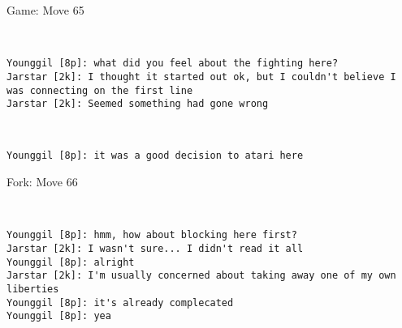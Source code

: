\documentclass{article}
\begin{document}
\begin{section}{Game: Move 65}
\begin{center}
\cleargoban
{}
\showfullgoban
\\\begin{lstlisting}
Younggil [8p]: what did you feel about the fighting here?
Jarstar [2k]: I thought it started out ok, but I couldn't believe I was connecting on the first line
Jarstar [2k]: Seemed something had gone wrong
\end{lstlisting}
\end{center}
\begin{center}
\cleargoban
{}
\showfullgoban
\\\begin{lstlisting}
Younggil [8p]: it was a good decision to atari here
\end{lstlisting}
\end{center}
\end{section}
\begin{subsection}{Fork: Move 66}
\begin{center}
\cleargoban
{}
\showfullgoban
\\\begin{lstlisting}
Younggil [8p]: hmm, how about blocking here first?
Jarstar [2k]: I wasn't sure... I didn't read it all
Younggil [8p]: alright
Jarstar [2k]: I'm usually concerned about taking away one of my own liberties
Younggil [8p]: it's already complecated
Younggil [8p]: yea
\end{lstlisting}
\end{center}
\end{subsection}
\newpage
\end{document}
